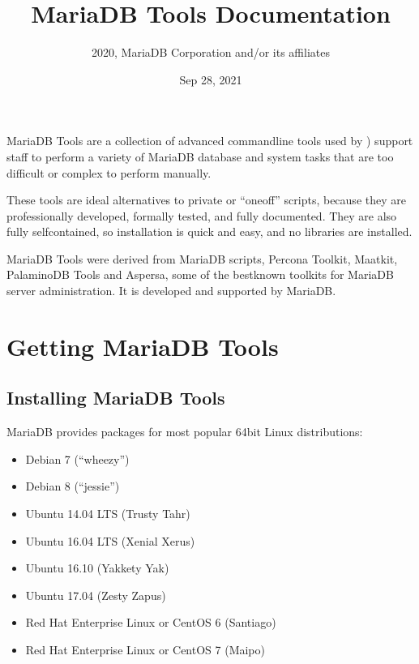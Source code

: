 \documentclass[letterpaper,10pt,english]{sphinxmanual}
\title{MariaDB Tools Documentation}
\date{Sep 28, 2021}
\author{2020, MariaDB Corporation and/or its affiliates}
\begin{document}
\pagestyle{empty}
\sphinxmaketitle
\pagestyle{plain}
\sphinxtableofcontents
\pagestyle{normal}
\label{\detokenize{index::doc}}


\sphinxAtStartPar
MariaDB Tools are a collection of advanced command\sphinxhyphen{}line tools
used by ) support staff
to perform a variety of MariaDB database and system tasks
that are too difficult or complex to perform manually.

\sphinxAtStartPar
These tools are ideal alternatives to private or “one\sphinxhyphen{}off” scripts,
because they are professionally developed, formally tested,
and fully documented.
They are also fully self\sphinxhyphen{}contained,
so installation is quick and easy,
and no libraries are installed.

\sphinxAtStartPar
MariaDB Tools were derived from MariaDB scripts, Percona Toolkit,
Maatkit, PalaminoDB Tools and Aspersa,
some of the best\sphinxhyphen{}known toolkits for MariaDB server administration.
It is developed and supported by MariaDB.


\part{Getting MariaDB Tools}
\label{\detokenize{index:getting-mariadb-tools}}

\chapter{Installing MariaDB Tools}
\label{\detokenize{installation:installing-mariadb-tools}}\label{\detokenize{installation:install}}\label{\detokenize{installation::doc}}
\sphinxAtStartPar
MariaDB provides packages for most popular 64\sphinxhyphen{}bit Linux distributions:
\begin{itemize}
\item {} 
\sphinxAtStartPar
Debian 7 (“wheezy”)

\item {} 
\sphinxAtStartPar
Debian 8 (“jessie”)

\item {} 
\sphinxAtStartPar
Ubuntu 14.04 LTS (Trusty Tahr)

\item {} 
\sphinxAtStartPar
Ubuntu 16.04 LTS (Xenial Xerus)

\item {} 
\sphinxAtStartPar
Ubuntu 16.10 (Yakkety Yak)

\item {} 
\sphinxAtStartPar
Ubuntu 17.04 (Zesty Zapus)

\item {} 
\sphinxAtStartPar
Red Hat Enterprise Linux or CentOS 6 (Santiago)

\item {} 
\sphinxAtStartPar
Red Hat Enterprise Linux or CentOS 7 (Maipo)

\end{itemize}
\end{document}
